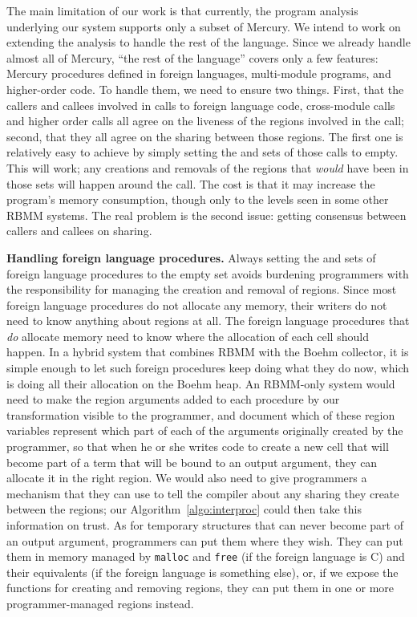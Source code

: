 \documentclass{tlp}
\newcommand{\code}[1]{{\tt#1}}
\begin{document}
The main limitation of our work is that currently,
the program analysis underlying our system supports only a subset of Mercury.
We intend to work on extending the analysis to handle the rest of the language.
Since we already handle almost all of Mercury,
``the rest of the language'' covers only a few features:
Mercury procedures defined in foreign languages,
multi-module programs, and higher-order code.
To handle them, we need to ensure two things.
First, that the callers and callees involved in
calls to foreign language code, cross-module calls and higher order calls
all agree on the liveness of the regions involved in the call;
second, that they all agree on the sharing between those regions.
The first one is relatively easy to achieve
by simply setting the  and  sets of those calls to empty.
This will work;
any creations and removals of the regions
that \emph{would} have been in those sets will happen around the call.
The cost is that it may increase the program's memory consumption,
though only to the levels seen in some other RBMM systems.
The real problem is the second issue:
getting consensus between callers and callees on sharing.

\noindent\textbf{Handling foreign language procedures.}
Always setting the  and  sets
of foreign language procedures to the empty set
avoids burdening programmers with the responsibility
for managing the creation and removal of regions.
Since most foreign language procedures do not allocate any memory,
their writers do not need to know anything about regions at all.
The foreign language procedures that \emph{do} allocate memory
need to know where the allocation of each cell should happen.
In a hybrid system that combines RBMM with the Boehm collector,
it is simple enough to let such foreign procedures
keep doing what they do now,
which is doing all their allocation on the Boehm heap.
An RBMM-only system would need to make
the region arguments added to each procedure by our transformation
visible to the programmer,
and document which of these region variables represent
which part of each of the arguments originally created by the programmer,
so that when he or she writes code to create a new cell
that will become part of a term that will be bound to an output argument,
they can allocate it in the right region.
We would also need to give programmers a mechanism
that they can use to tell the compiler about any sharing they create
between the regions;
our Algorithm~\ref{algo:interproc} could then take this information on trust.
As for temporary structures that can never become part of an output argument,
programmers can put them where they wish.
They can put them in memory managed
by \code{malloc} and \code{free} (if the foreign language is C)
and their equivalents (if the foreign language is something else),
or, if we expose the functions for creating and removing regions,
they can put them in one or more programmer-managed regions instead.
\end{document}
